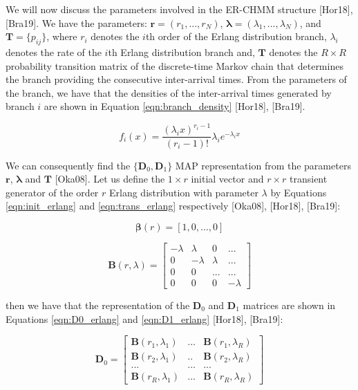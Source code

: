 \documentclass[a4paper,11pt,titlepage]{article}
\begin{document}
We will now discuss the parameters involved in the ER-CHMM structure [Hor18], [Bra19]. We have the parameters: $\mathbf{r} = (r_1,...,r_N)$, $\bm{\lambda} = (\lambda_1,...,\lambda_N)$, and $\mathbf{T}= \{p_{ij}\}$, where $r_i$ denotes the $i$th order of the Erlang distribution branch, $\lambda_i$ denotes the rate of the $i$th Erlang distribution branch and, $\mathbf{T}$ denotes the $R \times R$ probability transition matrix of the discrete-time Markov chain that determines the branch providing the consecutive inter-arrival times. From the parameters of the branch, we have that the densities of the inter-arrival times generated by branch $i$ are shown in Equation \ref{eqn:branch_density} [Hor18], [Bra19]. 

\begin{equation}
f_i(x) = \frac{(\lambda_i x)^{r_{i}-1}}{(r_i-1)!} \lambda_i e^{-\lambda_i x}
\label{eqn:branch_density}
\end{equation}

We can consequently find the $\{\mathbf{D}_0, \mathbf{D}_1\}$ MAP representation from the parameters $\mathbf{r}$, $\bm{\lambda}$ and $\mathbf{T}$ [Oka08]. Let us define the $1 \times r$ initial vector and $r \times r$ transient generator of the order $r$ Erlang distribution with parameter $\lambda$ by Equations \ref{eqn:init_erlang} and \ref{eqn:trans_erlang} respectively [Oka08], [Hor18], [Bra19]: 

\begin{equation}
    \bm{\beta}(r) = [1,0,...,0]
    \label{eqn:init_erlang}
\end{equation}

\begin{equation}
    \mathbf{B}(r,\lambda) = \begin{bmatrix}
     -\lambda & \lambda & 0 & ... \\
     0 & -\lambda & \lambda & ... \\
     0 & 0 & ... & ... \\
     0 & 0 & 0 & -\lambda
    \end{bmatrix}
    \label{eqn:trans_erlang}
\end{equation}

then we have that the representation of the $\mathbf{D}_0$ and $\mathbf{D}_1$ matrices are shown in Equations \ref{eqn:D0_erlang} and \ref{eqn:D1_erlang} [Hor18], [Bra19]: 

\begin{equation}
    \mathbf{D}_0 = \begin{bmatrix}
     \mathbf{B}(r_1,\lambda_1) & ... & \mathbf{B}(r_1,\lambda_R)  \\
     \mathbf{B}(r_2,\lambda_1) & .. & \mathbf{B}(r_2,\lambda_R) \\
     ... & ... & ... \\
     \mathbf{B}(r_R,\lambda_1) & ... & \mathbf{B}(r_R,\lambda_R)
    \end{bmatrix}
    \label{eqn:D0_erlang}
\end{equation}
\end{document}
